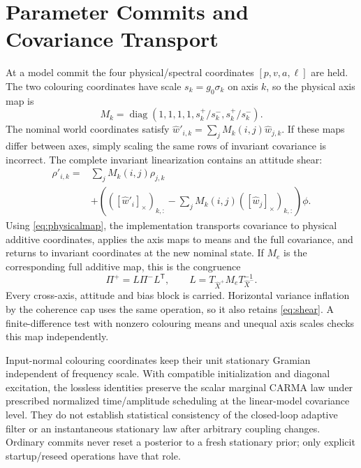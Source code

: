 \documentclass[conference]{IEEEtran}
\newcommand{\tr}{^{\mathsf T}}
\newcommand{\sk}[1]{[#1]_\times}
\DeclareMathOperator{\diag}{diag}
\begin{document}
\section{Parameter Commits and Covariance Transport}
\label{sec:commits}
At a model commit the four physical/spectral coordinates $[p,v,a,\ell]$ are
held. The two colouring coordinates have scale $s_k=g_0\sigma_k$ on axis $k$,
so the physical axis map is
\begin{equation}
 M_k=\diag(1,1,1,1,s_k^+/s_k^-,s_k^+/s_k^-).
\end{equation}
The nominal world coordinates satisfy
$\hat w'_{i,k}=\sum_jM_k(i,j)\hat w_{j,k}$. If these maps differ between
axes, simply scaling the same rows of invariant covariance is incorrect.
The complete invariant linearization contains an attitude shear:
\begin{equation}
 \begin{split}
 \rho'_{i,k}={}&\sum_jM_k(i,j)\rho_{j,k}\\
 &+\left((\sk{\hat w'_i})_{k,:}
       -\sum_jM_k(i,j)(\sk{\hat w_j})_{k,:}\right)\phi.
 \end{split}
 \label{eq:shear}
\end{equation}
Using \cref{eq:physicalmap}, the implementation transports covariance to
physical additive coordinates, applies the axis maps to means and the full
covariance, and returns to invariant coordinates at the new nominal state.
If $M_e$ is the corresponding full additive map, this is the congruence
\begin{equation}
 \Pi^+=L\Pi^-L\tr,\qquad L=T_{\hat X^+}M_eT_{\hat X^-}^{-1}.
\end{equation}
Every cross-axis, attitude and bias block is carried. Horizontal variance
inflation by the coherence cap uses the same operation, so it also retains
\cref{eq:shear}. A finite-difference test with nonzero colouring means and
unequal axis scales checks this map independently.

Input-normal colouring coordinates keep their unit stationary Gramian
independent of frequency scale. With compatible initialization and diagonal
excitation, the lossless identities preserve the scalar marginal CARMA law
under prescribed normalized time/amplitude scheduling at the linear-model
covariance level. They do not establish statistical consistency of the
closed-loop adaptive filter or an instantaneous stationary law after arbitrary
coupling changes. Ordinary commits never reset a posterior to a fresh stationary
prior; only explicit startup/reseed operations have that role.
\end{document}
